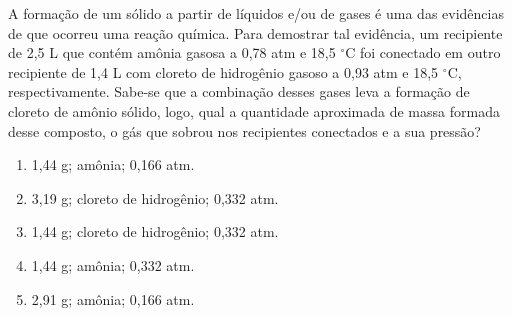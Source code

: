 A formação de um sólido a partir de líquidos e/ou de gases é uma das evidências de que ocorreu uma reação química. Para demostrar tal evidência, um recipiente de 2,5 L que contém amônia gasosa a 0,78 atm e 18,5 $^\circ$C foi conectado em outro recipiente de 1,4 L com cloreto de hidrogênio gasoso a 0,93 atm e 18,5 $^\circ$C, respectivamente. Sabe-se que a combinação desses gases leva a formação de cloreto de amônio sólido, logo, qual a quantidade aproximada de massa formada desse composto, o gás que sobrou nos recipientes conectados e a sua pressão?

\begin{enumerate}[label = (\alph*)]
	\item 1,44 g; amônia; 0,166 atm.
	\item 3,19 g; cloreto de hidrogênio; 0,332 atm.
	\item 1,44 g; cloreto de hidrogênio; 0,332 atm.
	\item 1,44 g; amônia; 0,332 atm.
	\item 2,91 g; amônia; 0,166 atm.
\end{enumerate}
